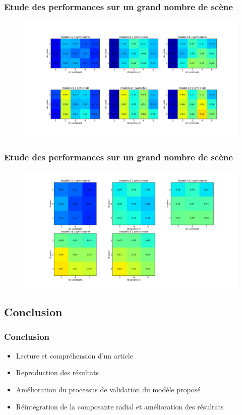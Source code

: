 \documentclass{beamer}
\newenvironment{changemargin}[2]{%
  \begin{list}{}{%
    \setlength{\topsep}{0pt}%
    \setlength{\leftmargin}{#1}%
    \setlength{\rightmargin}{#2}%
    \setlength{\listparindent}{\parindent}%
    \setlength{\itemindent}{\parindent}%
    \setlength{\parsep}{\parskip}%
  }%
  \item[]}{\end{list}}
\begin{document}
\begin{frame}
  \frametitle{Etude des performances sur un grand nombre de scène}
  \begin{changemargin}{-1.0cm}{0cm}
  \begin{figure}
    \centering
    \includegraphics[scale=0.3]{res_sym.png}
  \end{figure}  
  \end{changemargin}
\end{frame}

\begin{frame}
  \frametitle{Etude des performances sur un grand nombre de scène}
  \begin{changemargin}{-1.0cm}{0cm}
  \begin{figure}
    \centering
    \includegraphics[scale=0.3]{res_45.png}
  \end{figure}  
  \end{changemargin}
\end{frame}

\subsection{Conclusion}%

\begin{frame}
  \frametitle{Conclusion}
  \begin{itemize}
    \item Lecture et compréhension d'un article
    \item Reproduction des résultats
    \item Amélioration du processus de validation du modèle proposé
    \item Réintégration de la composante radial et amélioration des résultats    
  \end{itemize}
\end{frame}
\end{document}
